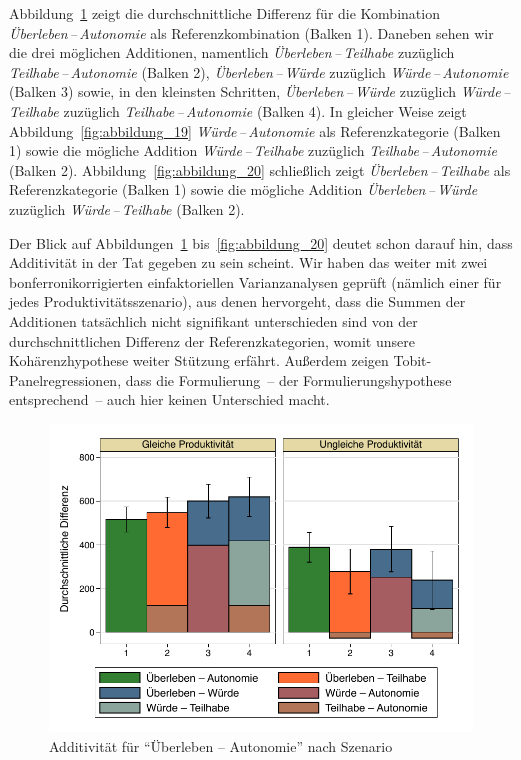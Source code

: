 \documentclass[justified,nobib,nohyper,symmetric,twoside]{tufte-book}
\begin{document}
Abbildung~\ref{fig:abbildung_18} zeigt die durchschnittliche Differenz für die Kombination \textit{Überleben\,--\,Autonomie} als Referenzkombination (Balken 1).
Daneben sehen wir die drei möglichen Additionen, namentlich \textit{Überleben\,--\,Teilhabe} zuzüglich \textit{Teilhabe\,--\,Autonomie} (Balken 2), \textit{Überleben\,--\,Würde} zuzüglich \textit{Würde\,--\,Autonomie} (Balken 3) sowie, in den kleinsten Schritten, \textit{Überleben\,--\,Würde} zuzüglich \textit{Würde\,--\,Teilhabe} zuzüglich \textit{Teilhabe\,--\,Autonomie} (Balken 4). In gleicher Weise zeigt Abbildung~\ref{fig:abbildung_19} \textit{Würde\,--\,Autonomie} als Referenzkategorie (Balken 1) sowie die mögliche Addition \textit{Würde\,--\,Teilhabe} zuzüglich \textit{Teilhabe\,--\,Autonomie} (Balken 2). Abbildung~\ref{fig:abbildung_20} schließlich zeigt \textit{Überleben\,--\,Teilhabe} als Referenzkategorie (Balken 1) sowie die mögliche Addition \textit{Überleben\,--\,Würde} zuzüglich \textit{Würde\,--\,Teilhabe} (Balken 2).

Der Blick auf Abbildungen~\ref{fig:abbildung_18} bis~\ref{fig:abbildung_20} deutet schon darauf hin, dass Additivität in der Tat gegeben zu sein scheint.
Wir haben das weiter mit zwei bonferronikorrigierten einfaktoriellen Varianzanalysen geprüft (nämlich einer für jedes Produktivitätsszenario), aus denen hervorgeht, dass die Summen der Additionen tatsächlich nicht signifikant unterschieden sind von der durchschnittlichen Differenz der Referenzkategorien, womit unsere Kohärenzhypothese weiter Stützung erfährt.
Außerdem zeigen Tobit-Panelregressionen, dass die Formulierung~-- der Formulierungshypothese entsprechend~-- auch hier keinen Unterschied macht.

\begin{figure}[t]\label{fig:abbildung_18}
   \center
   \caption{Additivität für \enquote{Überleben -- Autonomie} nach Szenario}
   \includegraphics[width=0.99\linewidth]{figure_18.pdf}
\end{figure}
\end{document}
